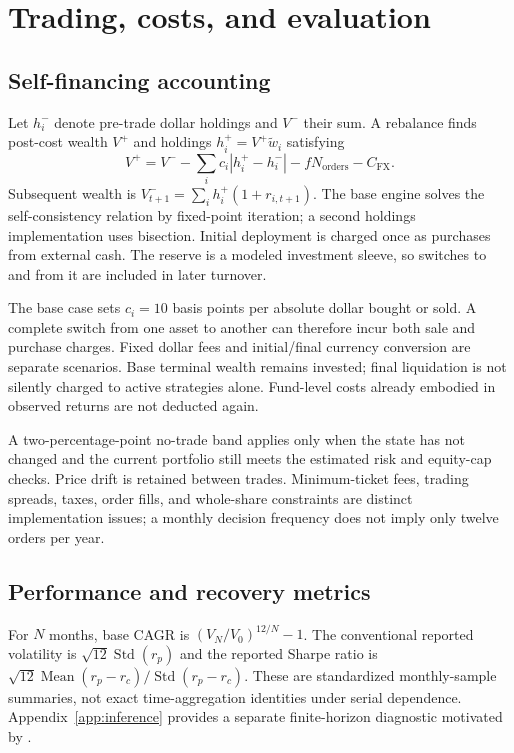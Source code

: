 \documentclass[12pt,letterpaper]{article}
\begin{document}
\section{Trading, costs, and evaluation}
\subsection{Self-financing accounting}
Let $h_i^{-}$ denote pre-trade dollar holdings and $V^{-}$ their sum. A rebalance finds post-cost wealth $V^{+}$ and holdings $h_i^{+}=V^{+}\widetilde w_i$ satisfying
\begin{equation}
V^{+}=V^{-}-\sum_i c_i|h_i^{+}-h_i^{-}|-fN_{\mathrm{orders}}-C_{\mathrm{FX}}.\label{eq:account}
\end{equation}
Subsequent wealth is $V_{t+1}^{-}=\sum_i h_i^{+}(1+r_{i,t+1})$. The base engine solves the self-consistency relation by fixed-point iteration; a second holdings implementation uses bisection. Initial deployment is charged once as purchases from external cash. The reserve is a modeled investment sleeve, so switches to and from it are included in later turnover.

The base case sets $c_i=10$ basis points per absolute dollar bought or sold. A complete switch from one asset to another can therefore incur both sale and purchase charges. Fixed dollar fees and initial/final currency conversion are separate scenarios. Base terminal wealth remains invested; final liquidation is not silently charged to active strategies alone. Fund-level costs already embodied in observed returns are not deducted again.

A two-percentage-point no-trade band applies only when the state has not changed and the current portfolio still meets the estimated risk and equity-cap checks. Price drift is retained between trades. Minimum-ticket fees, trading spreads, taxes, order fills, and whole-share constraints are distinct implementation issues; a monthly decision frequency does not imply only twelve orders per year.

\subsection{Performance and recovery metrics}
For $N$ months, base CAGR is $(V_N/V_0)^{12/N}-1$. The conventional reported volatility is $\sqrt{12}\operatorname{Std}(r_p)$ and the reported Sharpe ratio is $\sqrt{12}\operatorname{Mean}(r_p-r_c)/\operatorname{Std}(r_p-r_c)$. These are standardized monthly-sample summaries, not exact time-aggregation identities under serial dependence. Appendix~\ref{app:inference} provides a separate finite-horizon diagnostic motivated by \citet{lo2002}.
\end{document}

